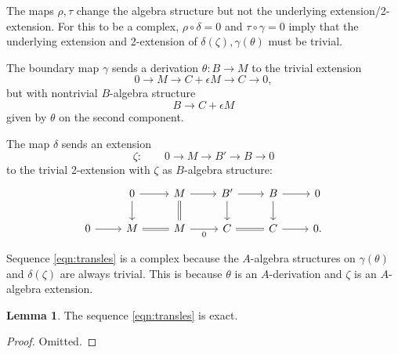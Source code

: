 \documentclass[11pt,reqno]{amsart}
\theoremstyle{definition}
\newtheorem{lemma}[theorem]{Lemma}
\newcommand{\EExal}{\underline{\textrm{Exal}}}
\renewcommand{\bar}[1]{\overline{#1}}
\begin{document}
The maps $\rho, \tau$ change the algebra structure but not the underlying extension/2-extension. For this to be a complex, $\rho \circ \delta = 0$ and $\tau \circ \gamma = 0$ imply that the underlying extension and 2-extension of $\delta(\zeta), \gamma(\theta)$ must be trivial. 


The boundary map $\gamma$ sends a derivation $\theta : B \to M$ to the trivial extension
\[0 \to M \to C + \epsilon M \to C \to 0,\]
but with nontrivial $B$-algebra structure
\[B \to C + \epsilon M\]
given by $\theta$ on the second component. 


The map $\delta$ sends an extension 
\[\zeta : \qquad 0 \to M \to B' \to B \to 0\]
to the trivial 2-extension with $\zeta$ as $B$-algebra structure:
\[\begin{tikzcd}
 &0 \ar[r] \ar[d] &M \ar[r] \ar[d, equals] &B' \ar[r] \ar[d] &B \ar[r] \ar[d] &0 \\
0 \ar[r] &M \ar[r, equals] &M \ar[r, "0", swap] &C \ar[r, equals] &C \ar[r] &0.
\end{tikzcd}\]

Sequence \eqref{eqn:transles} is a complex because the $A$-algebra structures on $\gamma(\theta)$ and $\delta(\zeta)$ are always trivial. This is because $\theta$ is an $A$-derivation and $\zeta$ is an $A$-algebra extension. 


\begin{lemma}\label{lem:exacttransles}
The sequence \eqref{eqn:transles} is exact. 
\end{lemma}

\begin{proof}

Omitted. 


\end{proof}
\end{document}
